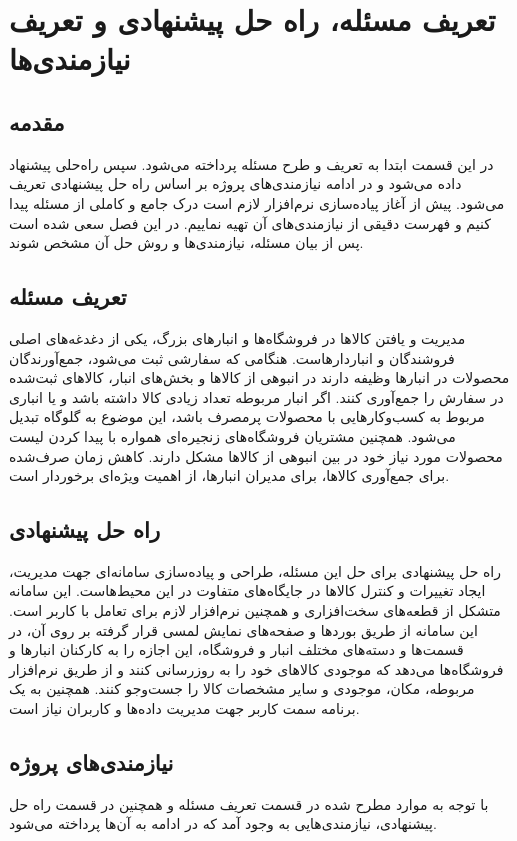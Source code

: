\chapter{تعریف مسئله، راه حل پیشنهادی و تعریف نیازمندی‌ها}
\section{مقدمه}
در این قسمت ابتدا به تعریف و طرح مسئله پرداخته می‌شود. سپس راه‌حلی پیشنهاد داده می‌شود و در ادامه نیازمندی‌های پروژه بر اساس راه حل پیشنهادی تعریف می‌شود.
پیش از آغاز پیاده‌سازی نرم‌افزار لازم است درک جامع و کاملی از مسئله پیدا کنیم و فهرست دقیقی از نیازمندی‌های آن تهیه نماییم. در این فصل سعی شده است پس از بیان مسئله، نیازمندی‌ها و روش حل آن مشخص شوند.

\section{تعریف مسئله}
مدیریت و یافتن کالاها در فروشگاه‌ها و انبار‌های بزرگ، یکی از دغدغه‌های اصلی فروشندگان و انباردارهاست. هنگامی که سفارشی ثبت می‌شود، جمع‌آورندگان محصولات در انبارها وظیفه دارند در انبوهی از کالاها و بخش‌های انبار، کالاهای ثبت‌شده در سفارش را جمع‌آوری کنند. اگر انبار مربوطه تعداد زیادی کالا داشته باشد و یا انباری مربوط به کسب‌و‌کارهایی با محصولات پرمصرف باشد، این موضوع به گلوگاه تبدیل می‌شود. همچنین مشتریان فروشگاه‌های زنجیره‌ای همواره با پیدا کردن لیست محصولات مورد نیاز خود در بین انبوهی از کالاها مشکل دارند. کاهش زمان صرف‌شده برای جمع‌آوری کالاها، برای مدیران 
انبارها، از اهمیت ویژه‌ای برخوردار است.


\section{راه حل پیشنهادی} 
راه حل پیشنهادی برای حل این مسئله، طراحی و پیاده‌سازی سامانه‌ای جهت مدیریت، ایجاد تغییرات و کنترل کالاها در جایگاه‌های متفاوت در این محیط‌هاست. این سامانه متشکل از قطعه‌های سخت‌افزاری و همچنین نرم‌افزار لازم برای تعامل با کاربر است. این سامانه از طریق بوردها و صفحه‌های نمایش لمسی قرار گرفته بر روی آن، در قسمت‌ها و دسته‌های مختلف انبار و فروشگاه، این اجازه را به کارکنان انبارها و فروشگاه‌ها می‌دهد که موجودی کالا‌های خود را به روز‌رسانی کنند و از طریق نرم‌افزار مربوطه، مکان، موجودی و سایر مشخصات کالا را جست‌و‌جو کنند. همچنین به یک برنامه سمت کاربر جهت مدیریت داده‌ها و کاربران نیاز است.


\section{نیازمندی‌های پروژه}
با توجه به موارد مطرح شده در قسمت تعریف مسئله و همچنین در قسمت راه حل پیشنهادی، نیازمندی‌هایی به وجود آمد که در ادامه به آن‌ها پرداخته می‌شود.

